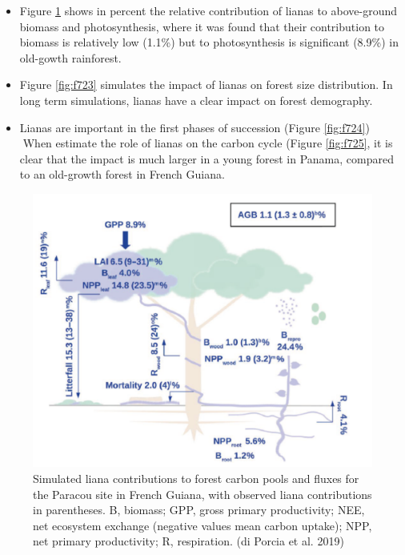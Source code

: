 \documentclass[12pt,oneside]{book}
\providecommand{\tightlist}{%
  \setlength{\itemsep}{0pt}\setlength{\parskip}{0pt}}
\begin{document}
\begin{itemize}
\tightlist
\item
  Figure \ref{fig:f722} shows in percent the relative contribution of
  lianas to above-ground biomass and photosynthesis, where it was found
  that their contribution to biomass is relatively low (1.1\%) but to
  photosynthesis is significant (8.9\%) in old-gowth rainforest.
\item
  Figure \ref{fig:f723} simulates the impact of lianas on forest size
  distribution. In long term simulations, lianas have a clear impact on
  forest demography.
\item
  Lianas are important in the first phases of succession (Figure
  \ref{fig:f724}) When estimate the role of lianas on the carbon cycle
  (Figure \ref{fig:f725}, it is clear that the impact is much larger in
  a young forest in Panama, compared to an old-growth forest in French
  Guiana.
\end{itemize}

\begin{figure}

{\centering \includegraphics[width=0.8\linewidth]{figures/chap7/f722_porcia1} 

}

\caption{Simulated liana contributions to forest carbon pools and fluxes for the Paracou site in French Guiana, with observed liana contributions in parentheses. B, biomass; GPP, gross primary productivity; NEE, net ecosystem exchange (negative values mean carbon uptake); NPP, net primary productivity; R, respiration. (di Porcia et al. 2019) }\label{fig:f722}
\end{figure}
\end{document}
